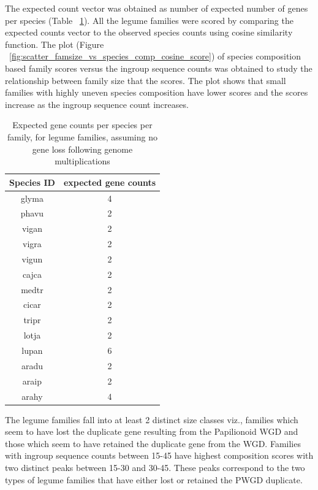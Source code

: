\documentclass{article}
\begin{document}
		The expected count vector was obtained as number of expected number of genes per species (Table  ~\ref{tab:exp_gene_count_table}). All the legume families were scored by comparing the expected counts vector to the observed species counts using cosine similarity function. The plot (Figure ~\ref{fig:scatter_famsize_vs_species_comp_cosine_score}) of species composition based family scores versus the ingroup sequence counts was obtained to study the relationship between family size that the scores. The plot shows that small families with highly uneven species composition have lower scores and the scores increase as the ingroup sequence count increases.
		
		\begin{table}[h!]
			\centering
			\begin{tabular}{|c |c |} 
				\hline
				Species ID & expected gene counts \\
				\hline\hline
				glyma & 4 \\ 
				\hline
				phavu & 2 \\
				\hline
				vigan & 2 \\
				\hline
				vigra & 2 \\
				\hline
				vigun & 2 \\ 
				\hline
				cajca & 2 \\
				\hline
				medtr & 2 \\
				\hline
				cicar & 2 \\
				\hline
				tripr & 2 \\
				\hline
				lotja & 2 \\
				\hline
				lupan & 6 \\
				\hline
				aradu & 2 \\
				\hline
				araip & 2 \\
				\hline
				arahy & 4 \\
				\hline
			\end{tabular}
			\caption{Expected gene counts per species per family, for legume families, assuming no gene loss following genome multiplications}
			\label{tab:exp_gene_count_table}
		\end{table}
		
		
		The legume families fall into at least 2 distinct size classes viz., families which seem to have lost the duplicate gene resulting from the Papilionoid WGD and those which seem to have retained the duplicate gene from the WGD. Families with ingroup sequence counts between 15-45 have highest composition scores with two distinct peaks between 15-30 and  30-45. These peaks correspond to the two types of legume families that have either lost or retained the PWGD duplicate.
		
\end{document}
